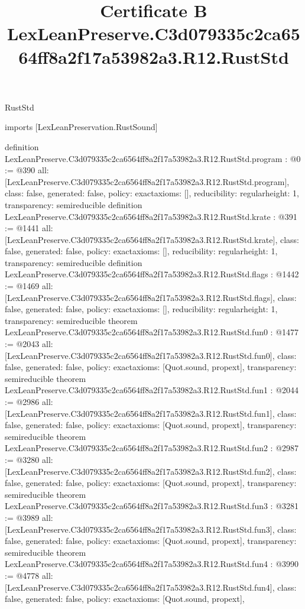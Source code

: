 \begin{lexlean}{RustStd}
\title{Certificate B LexLeanPreserve.C3d079335c2ca6564ff8a2f17a53982a3.R12.RustStd}
\begin{coremodule}
imports [LexLeanPreservation.RustSound]

definition LexLeanPreserve.C3d079335c2ca6564ff8a2f17a53982a3.R12.RustStd.program : @0 := @390 {
  all: [LexLeanPreserve.C3d079335c2ca6564ff8a2f17a53982a3.R12.RustStd.program],
  class: false,
  generated: false,
  policy: exact{axioms: []},
  reducibility: regular{height: 1},
  transparency: semireducible
}
definition LexLeanPreserve.C3d079335c2ca6564ff8a2f17a53982a3.R12.RustStd.krate : @391 := @1441 {
  all: [LexLeanPreserve.C3d079335c2ca6564ff8a2f17a53982a3.R12.RustStd.krate],
  class: false,
  generated: false,
  policy: exact{axioms: []},
  reducibility: regular{height: 1},
  transparency: semireducible
}
definition LexLeanPreserve.C3d079335c2ca6564ff8a2f17a53982a3.R12.RustStd.flags : @1442 := @1469 {
  all: [LexLeanPreserve.C3d079335c2ca6564ff8a2f17a53982a3.R12.RustStd.flags],
  class: false,
  generated: false,
  policy: exact{axioms: []},
  reducibility: regular{height: 1},
  transparency: semireducible
}
theorem LexLeanPreserve.C3d079335c2ca6564ff8a2f17a53982a3.R12.RustStd.fun0 : @1477 := @2043 {
  all: [LexLeanPreserve.C3d079335c2ca6564ff8a2f17a53982a3.R12.RustStd.fun0],
  class: false,
  generated: false,
  policy: exact{axioms: [Quot.sound, propext]},
  transparency: semireducible
}
theorem LexLeanPreserve.C3d079335c2ca6564ff8a2f17a53982a3.R12.RustStd.fun1 : @2044 := @2986 {
  all: [LexLeanPreserve.C3d079335c2ca6564ff8a2f17a53982a3.R12.RustStd.fun1],
  class: false,
  generated: false,
  policy: exact{axioms: [Quot.sound, propext]},
  transparency: semireducible
}
theorem LexLeanPreserve.C3d079335c2ca6564ff8a2f17a53982a3.R12.RustStd.fun2 : @2987 := @3280 {
  all: [LexLeanPreserve.C3d079335c2ca6564ff8a2f17a53982a3.R12.RustStd.fun2],
  class: false,
  generated: false,
  policy: exact{axioms: [Quot.sound, propext]},
  transparency: semireducible
}
theorem LexLeanPreserve.C3d079335c2ca6564ff8a2f17a53982a3.R12.RustStd.fun3 : @3281 := @3989 {
  all: [LexLeanPreserve.C3d079335c2ca6564ff8a2f17a53982a3.R12.RustStd.fun3],
  class: false,
  generated: false,
  policy: exact{axioms: [Quot.sound, propext]},
  transparency: semireducible
}
theorem LexLeanPreserve.C3d079335c2ca6564ff8a2f17a53982a3.R12.RustStd.fun4 : @3990 := @4778 {
  all: [LexLeanPreserve.C3d079335c2ca6564ff8a2f17a53982a3.R12.RustStd.fun4],
  class: false,
  generated: false,
  policy: exact{axioms: [Quot.sound, propext]},
}
\end{coremodule}
\end{lexlean}
